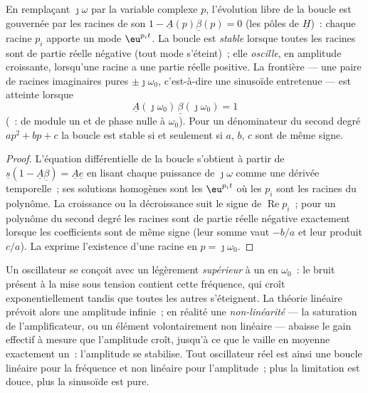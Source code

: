\begin{theorem}\label{thm:b2:feedback-oscillators:stability}
En remplaçant $\jmath\omega$ par la variable complexe $p$, l'évolution libre de
la boucle est gouvernée par les racines de son \emph{}
$1 - \underline A(p)\underline\beta(p) = 0$ (les pôles de $\underline H$)~: chaque racine
$p_i$ apporte un mode $\eu^{p_it}$. La boucle est \emph{stable} lorsque toutes les
racines sont de partie réelle négative (tout mode s'éteint)~; elle
\emph{oscille}, en amplitude croissante, lorsqu'une racine a une partie réelle
positive. La frontière --- une paire de racines imaginaires pures $\pm\jmath
\omega_0$, c'est-à-dire une sinusoïde entretenue --- est atteinte lorsque
\[
\underline A(\jmath\omega_0)\,\underline\beta(\jmath\omega_0) = 1
\]
(\emph{}~:  de module un et de phase
nulle à $\omega_0$). Pour un dénominateur du second degré $ap^2 + bp + c$ la
boucle est stable si et seulement si $a$, $b$, $c$ sont de même signe.
\end{theorem}

\begin{proof}
L'équation différentielle de la boucle s'obtient à partir de $\underline s(1 -
\underline A\underline\beta) = \underline A\underline e$ en lisant chaque puissance de $\jmath\omega$
comme une dérivée temporelle~; ses solutions homogènes sont les $\eu^{p_it}$
où les $p_i$ sont les racines du polynôme. La croissance ou la décroissance suit le
signe de $\operatorname{Re}p_i$~; pour un polynôme du second degré les racines
sont de partie réelle négative exactement lorsque les coefficients sont de même signe
(leur somme vaut $-b/a$ et leur produit $c/a$). La 
exprime l'existence d'une racine en $p = \jmath\omega_0$.
\end{proof}

\begin{remark}\label{rem:b2:feedback-oscillators:start}
Un oscillateur se conçoit avec un  légèrement \emph{supérieur} à
un en $\omega_0$~: le bruit présent à la mise sous tension contient cette fréquence,
qui croît exponentiellement tandis que toutes les autres s'éteignent. La théorie linéaire
prévoit alors une amplitude infinie~; en réalité une \emph{non-linéarité} ---
la saturation de l'amplificateur, ou un élément volontairement non linéaire
--- abaisse le gain effectif à mesure que l'amplitude croît, jusqu'à ce que le
 vaille en moyenne exactement un~: l'amplitude se stabilise. Tout oscillateur
réel est ainsi une boucle linéaire pour la fréquence et non linéaire
pour l'amplitude~; plus la limitation est douce, plus la sinusoïde est
pure.
\end{remark}

